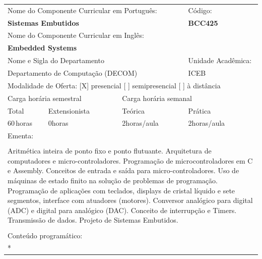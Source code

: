 \documentclass[11pt]{article}
\begin{document}
\begin{center}
\begin{longtable}{|p{4cm}|p{4cm}|p{4cm}|p{4cm}|}
\hline
\multicolumn{3}{|p{12cm}|}{Nome do Componente Curricular em Português:} &
\multicolumn{1}{p{4cm}|}{Código:} \\ 
\multicolumn{3}{|p{12cm}|}{\textbf{Sistemas Embutidos}} &
\textbf{BCC425}\\ 
\multicolumn{3}{|p{12cm}|}{Nome do Componente Curricular em Inglês:} & \\ 
\multicolumn{3}{|p{12cm}|}{\textbf{Embedded Systems}} & \\ 
\hline
\multicolumn{3}{|p{12cm}|}{Nome e Sigla do Departamento} & Unidade Acadêmica: \\ 
\multicolumn{3}{|p{12cm}|}{Departamento de Computação (DECOM)} & {ICEB} \\ 
\hline
\multicolumn{4}{|p{16cm}|}{Modalidade de Oferta:
[X] presencial \hspace{0.6cm}
[ ] semipresencial \hspace{0.6cm}
[ ] à distância}\\
\hline
\multicolumn{2}{|p{8cm}|}{Carga horária semestral} &
\multicolumn{2}{p{8cm}|}{Carga horária semanal}\\
\hline
\multicolumn{1}{|p{4cm}|}{Total} &
\multicolumn{1}{p{4cm}|}{Extensionista} &
\multicolumn{1}{p{4cm}|}{Teórica} &
\multicolumn{1}{p{4cm}|}{Prática} \\ 
\multicolumn{1}{|p{4cm}|}{60\,horas} &
\multicolumn{1}{p{4cm}|}{0\;horas} &
\multicolumn{1}{p{4cm}|}{2\;horas/aula} &
\multicolumn{1}{p{4cm}|}{2\;horas/aula} \\ 
\hline
\multicolumn{4}{|p{16cm}|}{Ementa:}\\
\multicolumn{4}{|p{16cm}|}{}\\
\multicolumn{4}{|p{\dimexpr 16cm + 6\tabcolsep\relax}|}{Aritmética inteira de ponto fixo e ponto flutuante. Arquitetura de computadores e micro-controladores. Programação de microcontroladores em C e Assembly. Conceitos de entrada e saída para micro-controladores. Uso de máquinas de estado finito na solução de problemas de programação. Programação de aplicações com teclados, displays de cristal líquido e sete segmentos, interface com atuadores (motores). Conversor analógico para digital (ADC) e digital para analógico (DAC). Conceito de interrupção e Timers. Transmissão de dados. Projeto de Sistemas Embutidos.}\\
\multicolumn{4}{|p{16cm}|}{}\\
\hline
\multicolumn{4}{|p{16cm}|}{Conteúdo programático:}\\*

\end{longtable}
\end{center}
\end{document}
